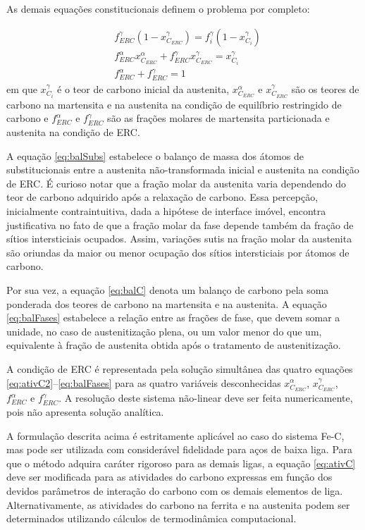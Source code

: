 As demais equações constitucionais definem o problema por completo:

\begin{subequations}[resume]
	\begin{align}
		&f_{ERC}^\gamma \left ( 1 - x_{C_{ERC}}^\gamma \right ) = f_i^\gamma \left ( 1 - x_{C_i}^\gamma \right )\label{eq:balSubs}\\
		&f_{ERC}^\alpha x_{C_{ERC}}^\alpha + f_{ERC}^\gamma x_{C_{ERC}}^\gamma = x_{C_i}^\gamma\label{eq:balC}\\
		&f_{ERC}^\alpha + f_{ERC}^\gamma = 1\label{eq:balFases}
	\end{align}
\end{subequations}
%
em que $x_{C_i}^\gamma$ é o teor de carbono inicial da austenita, $x_{C_{ERC}}^\alpha$ e $x_{C_{ERC}}^\gamma$ são os teores de carbono na martensita e na austenita na condição de equilíbrio restringido de carbono e $f_{ERC}^\alpha$ e $f_{ERC}^\gamma$ são as frações molares de martensita particionada e austenita na condição de ERC.

A equação \ref{eq:balSubs} estabelece o balanço de massa dos átomos de substitucionais entre a austenita não-transformada inicial e austenita na condição de ERC. É curioso notar que a fração molar da austenita varia dependendo do teor de carbono adquirido após a relaxação de carbono. Essa percepção, inicialmente contraintuitiva, dada a hipótese de interface imóvel, encontra justificativa no fato de que a fração molar da fase depende também da fração de sítios intersticiais ocupados. Assim, variações sutis na fração molar da austenita são oriundas da maior ou menor ocupação dos sítios intersticiais por átomos de carbono.

Por sua vez, a equação \ref{eq:balC} denota um balanço de carbono pela soma ponderada dos teores de carbono na martensita e na austenita. A equação \ref{eq:balFases} estabelece a relação entre as frações de fase, que devem somar a unidade, no caso de austenitização plena, ou um valor menor do que um, equivalente à fração de austenita obtida após o tratamento de austenitização.

A condição de ERC é representada pela solução simultânea das quatro equações \ref{eq:ativC2}--\ref{eq:balFases} para as quatro variáveis desconhecidas $x_{C_{ERC}}^\alpha$, $x_{C_{ERC}}^\gamma$, $f_{ERC}^\alpha$ e $f_{ERC}^\gamma$. A resolução deste sistema não-linear deve ser feita numericamente, pois não apresenta solução analítica.

A formulação descrita acima é estritamente aplicável ao caso do sistema Fe-C, mas pode ser utilizada com considerável fidelidade para aços de baixa liga\cite{Speer2003}. Para que o método adquira caráter rigoroso para as demais ligas, a equação \ref{eq:ativC} deve ser modificada para as atividades do carbono expressas em função dos devidos parâmetros de interação do carbono com os demais elementos de liga. Alternativamente, as atividades do carbono na ferrita e na austenita podem ser determinados utilizando cálculos de termodinâmica computacional.

